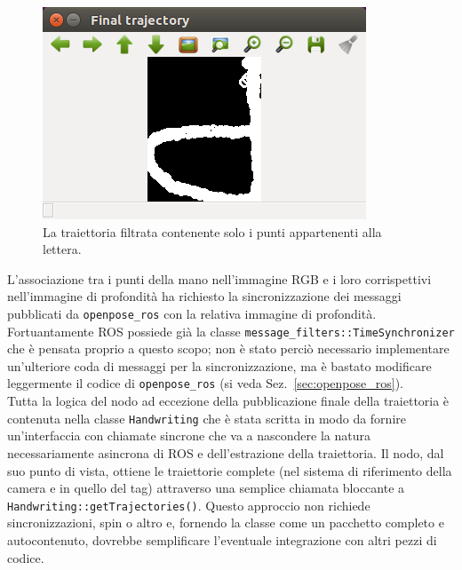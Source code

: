 \documentclass[10pt,twocolumn]{article}
\newcommand{\Sec}[1]{Sez.~\ref{#1}}
\begin{document}
  \begin{figure}[h]
    \centering
    \includegraphics[width=\linewidth]{immagini/final_trajectory.png}
    \caption{La traiettoria filtrata contenente solo i punti appartenenti alla lettera.}
    \label{f:final_trajectory}
  \end{figure}

  L'associazione tra i punti della mano nell'immagine RGB e i loro corrispettivi
  nell'immagine di profondità ha richiesto la sincronizzazione dei messaggi
  pubblicati da \verb|openpose_ros| con la relativa immagine di profondità.
  Fortuantamente ROS possiede già la classe
  \verb|message_filters::TimeSynchronizer| che è pensata proprio a questo scopo;
  non è stato perciò necessario implementare un'ulteriore coda di messaggi per
  la sincronizzazione, ma è bastato modificare leggermente il codice di
  \verb|openpose_ros| (si veda \Sec{sec:openpose_ros}). \\
  Tutta la logica del nodo ad eccezione della pubblicazione finale della
  traiettoria è contenuta nella classe \verb|Handwriting| che è stata scritta in
  modo da fornire un'interfaccia con chiamate sincrone che va a nascondere la
  natura necessariamente asincrona di ROS e dell'estrazione della traiettoria.
  Il nodo, dal suo punto di vista, ottiene le traiettorie complete (nel sistema
  di riferimento della camera e in quello del tag) attraverso una semplice
  chiamata bloccante a \verb|Handwriting::getTrajectories()|. Questo approccio
  non richiede sincronizzazioni, spin o altro e, fornendo la classe come un
  pacchetto completo e autocontenuto, dovrebbe semplificare l'eventuale
  integrazione con altri pezzi di codice.
\end{document}
